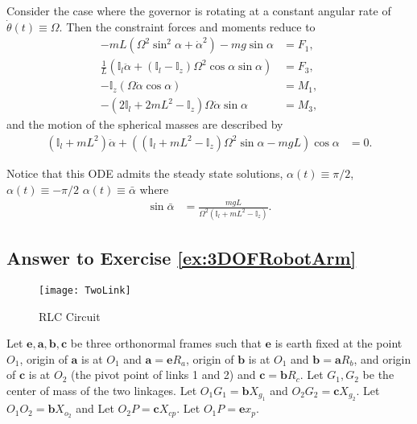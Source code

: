 \documentclass[graybox,envcountchap,sectrefs]{svmonoMuga}
\begin{document}
Consider the case where the governor is rotating at a constant angular rate of $\dot{\theta}(t)\equiv \Omega$. Then the constraint forces and moments reduce to
\begin{align*}
-mL({\Omega}^2\sin^2\alpha+\dot{\alpha}^2)-mg\sin\alpha &=F_1,\\
\frac{1}{L}\left(\mathbb{I}_l\ddot{\alpha} +(\mathbb{I}_l-\mathbb{I}_z){\Omega}^2\cos\alpha\sin\alpha\right)&=F_3,\\
-\mathbb{I}_z({\Omega}\dot{\alpha}\cos\alpha )&=M_1,\\
 - (2\mathbb{I}_l+2mL^2-\mathbb{I}_z){\Omega}\dot{\alpha}\sin\alpha&=M_3,
\end{align*}
and the motion of the spherical masses are described by 
\begin{align}
(\mathbb{I}_l+mL^2)\ddot{\alpha}+\left((\mathbb{I}_l+mL^2-\mathbb{I}_z){\Omega}^2\sin\alpha-mgL\right)\cos\alpha&=0.
\end{align}



Notice that this ODE admits the steady state solutions, ${\alpha}(t)\equiv \pi/2$, ${\alpha}(t)\equiv -\pi/2$ ${\alpha}(t)\equiv \bar{\alpha}$ where
\begin{align}
\sin\bar{\alpha}&=\frac{mgL}{\Omega^2(\mathbb{I}_l+mL^2-\mathbb{I}_z)}.
\end{align}




\subsection*{Answer to Exercise \ref{ex:3DOFRobotArm}}
\begin{figure}[ht]
\begin{center}
\texttt{[image: TwoLink]}
\renewcommand{\baselinestretch}{1}\selectfont
\caption{RLC Circuit}
\label{Fig:3DOF_RobotArm}
\end{center}
\end{figure}

Let $\mathbf{e,a,b,c}$ be three orthonormal frames such that $\mathbf{e}$ is earth fixed at the point $O_1$, origin of $\mathbf{a}$ is at $O_1$ and $\mathbf{a}=\mathbf{e}R_a$, origin of $\mathbf{b}$ is at $O_1$ and $\mathbf{b}=\mathbf{a}R_b$, and origin of $\mathbf{c}$ is at $O_2$ (the pivot point of links 1 and 2) and $\mathbf{c}=\mathbf{b}R_c$. Let $G_1,G_2$ be the center of mass of the two linkages. Let $O_1G_1=\mathbf{b}X_{g_1}$ and $O_2G_2=\mathbf{c}X_{g_2}$. Let $O_1O_2=\mathbf{b}X_{o_2}$  and Let $O_2P=\mathbf{c}X_{cp}$.  Let $O_1P=\mathbf{e}x_p$.
\end{document}
